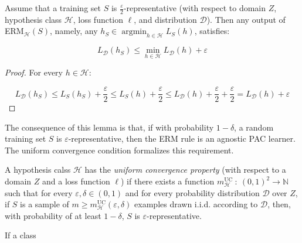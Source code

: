 \documentclass[../../main/main.tex]{subfiles}
\begin{document}
\begin{lemma}[]
	Assume that a training set \( S \) is \( \frac{\varepsilon}{2} \)-representative (with respect to domain \( Z \), hypothesis class \( \mathcal{H} \), loss function \( \ell \), and distribution \( \mathcal{D} \)).
	Then any output of ERM$_{\mathcal{H}}(S)$, namely, any \( h_S \in \operatorname{argmin}_{h \in \mathcal{H}} L_S(h) \), satisfies:

	\begin{equation}
	    L_{\mathcal{D}}(h_S)
		\le
		\underset{h \in \mathcal{H}}{\min{}} L_{\mathcal{D}}(h) + \varepsilon
	    \label{eq:C3_HERL}
	\end{equation}
\end{lemma}

\begin{proof}
	For every \( h \in \mathcal{H} \):

	\[
	    L_{\mathcal{D}}(h_S)
		\le
		L_S(h_S) + \frac{\varepsilon}{2}
		\le
		L_S(h) + \frac{\varepsilon}{2}
		\le
		L_{\mathcal{D}}(h) + \frac{\varepsilon}{2} + \frac{\varepsilon}{2}
		=
		L_{\mathcal{D}}(h) + \varepsilon
	\]
\end{proof}

The consequence of this lemma is that, if with probability \( 1 - \delta \), a random training set \( S \) is \( \varepsilon \)-representative, then the ERM rule is an agnostic PAC learner. The uniform convergence condition formalizes this requirement.

\begin{definition}
	A hypothesis calss \( \mathcal{H} \) has the \emph{uniform convergence property} (with respect to a domain \( Z \) and a loss function \( \ell \))
	if there exists a function \( m_{\mathcal{H}}^{\text{UC}} \ : \ (0,1)^2 \to \mathbb{N} \) such that for every \( \varepsilon, \delta \in (0,1) \)
	and for every probability distribution \( \mathcal{D} \) over \( Z \), if \( S \) is a sample of \( m \ge m_{\mathcal{H}}^{\text{UC}}(\varepsilon,\delta ) \) examples drawn i.i.d. according to \( \mathcal{D} \),
	then, with probability of at least \( 1 - \delta \), \( S \) is \( \varepsilon \)-representative.
\end{definition}

\begin{corollary}[]
	If a class
\end{corollary}
\end{document}
